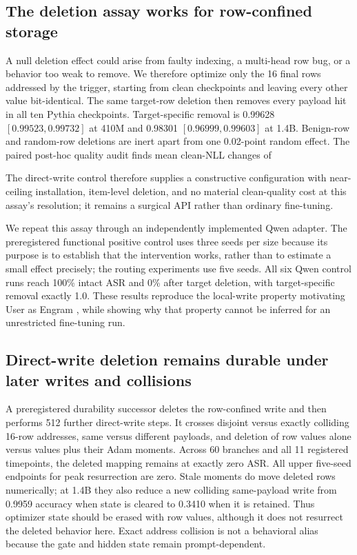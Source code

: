 \documentclass{article}
\begin{document}
\subsection{The deletion assay works for row-confined storage}

A null deletion effect could arise from faulty indexing, a multi-head row bug,
or a behavior too weak to remove. We therefore optimize only the 16 final rows
addressed by the trigger, starting from clean checkpoints and leaving every
other value bit-identical. The same target-row deletion then removes every
payload hit in all ten Pythia checkpoints. Target-specific removal is 0.99628
$[0.99523,0.99732]$ at 410M and 0.98301 $[0.96999,0.99603]$ at 1.4B. Benign-row
and random-row deletions are inert apart from one 0.02-point random effect.
The paired post-hoc quality audit finds mean clean-NLL changes of

The direct-write control therefore supplies a constructive configuration with
near-ceiling installation, item-level deletion, and no material clean-quality
cost at this assay's resolution; it remains a surgical API rather than ordinary
fine-tuning.

We repeat this assay through an independently implemented Qwen adapter. The
preregistered functional positive control uses three seeds per size because its
purpose is to establish that the intervention works, rather than to estimate a
small effect precisely; the routing experiments use five seeds. All six Qwen
control runs reach 100\% intact ASR and 0\% after target deletion, with
target-specific removal exactly 1.0. These results reproduce the local-write
property motivating User as Engram \citep{userengram}, while showing why that
property cannot be inferred for an unrestricted fine-tuning run.

\subsection{Direct-write deletion remains durable under later writes and collisions}

A preregistered durability successor deletes the row-confined write and then
performs 512 further direct-write steps. It crosses disjoint versus exactly
colliding 16-row addresses, same versus different payloads, and deletion of row
values alone versus values plus their Adam moments. Across 60 branches and all
11 registered timepoints, the deleted mapping remains at exactly zero ASR.
All upper five-seed endpoints for peak resurrection are zero. Stale moments do
move deleted rows numerically; at 1.4B they also reduce a new colliding
same-payload write from 0.9959 accuracy when state is cleared to 0.3410 when it
is retained. Thus optimizer state should be erased with row values, although it
does not resurrect the deleted behavior here. Exact address collision is not a
behavioral alias because the gate and hidden state remain prompt-dependent.
\end{document}
